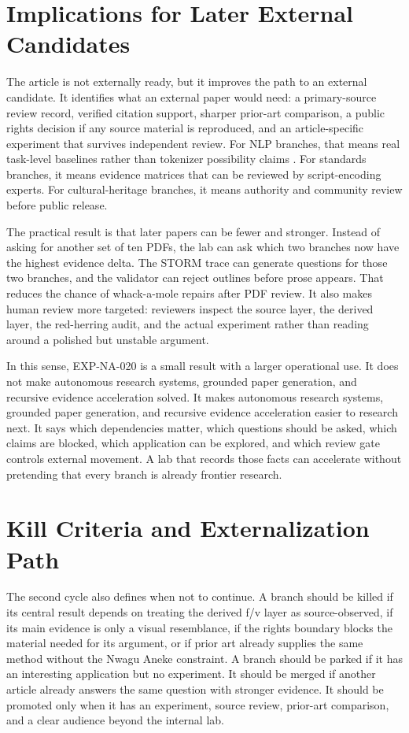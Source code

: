 \documentclass[sigconf,nonacm]{acmart}
\begin{document}
\section{Implications for Later External Candidates}
The article is not externally ready, but it improves the path to an external
candidate. It identifies what an external paper would need: a primary-source
review record, verified citation support, sharper prior-art comparison, a public
rights decision if any source material is reproduced, and an article-specific
experiment that survives independent review. For NLP branches, that means real
task-level baselines rather than tokenizer possibility claims \cite{wadden2020scifact,gao2023alce,sennrich2016bpe,kudo2018sentencepiece,bostrom2020bytepair,rust2021tokenization}.
For standards branches, it means evidence matrices that can be reviewed by
script-encoding experts. For cultural-heritage branches, it means authority and
community review before public release.

The practical result is that later papers can be fewer and stronger. Instead of
asking for another set of ten PDFs, the lab can ask which two branches now have
the highest evidence delta. The STORM trace can generate questions for those two
branches, and the validator can reject outlines before prose appears. That
reduces the chance of whack-a-mole repairs after PDF review. It also makes
human review more targeted: reviewers inspect the source layer, the derived
layer, the red-herring audit, and the actual experiment rather than reading
around a polished but unstable argument.

In this sense, EXP-NA-020 is a small result with a larger operational use. It
does not make autonomous research systems, grounded paper generation, and recursive evidence acceleration solved. It makes autonomous research systems, grounded paper generation, and recursive evidence acceleration easier to research next. It says
which dependencies matter, which questions should be asked, which claims are
blocked, which application can be explored, and which review gate controls
external movement. A lab that records those facts can accelerate without
pretending that every branch is already frontier research.

\section{Kill Criteria and Externalization Path}
The second cycle also defines when not to continue. A branch should be killed if
its central result depends on treating the derived f/v layer as source-observed,
if its main evidence is only a visual resemblance, if the rights boundary blocks
the material needed for its argument, or if prior art already supplies the same
method without the Nwagu Aneke constraint. A branch should be parked if it has
an interesting application but no experiment. It should be merged if another
article already answers the same question with stronger evidence. It should be
promoted only when it has an experiment, source review, prior-art comparison,
and a clear audience beyond the internal lab.
\end{document}
